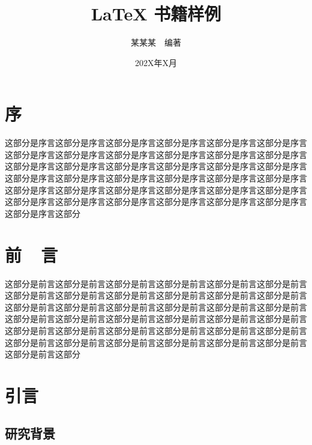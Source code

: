 \documentclass[UTF8,openany,twoside,12pt]{ctexbook}
\title{\bfseries LaTeX 书籍样例}
\author{\fangsong 某某某~~编著}
\date{\fangsong 202X年X月}
\theoremstyle{plain}
\renewcommand{\contentsname}{目~~录}%
\begin{document}
\maketitle

\thispagestyle{empty}

\frontmatter


\chapter{序}

这部分是序言这部分是序言这部分是序言这部分是序言这部分是序言这部分是序言这部分是序言这部分是序言这部分是序言这部分是序言这部分是序言这部分是序言这部分是序言这部分是序言这部分是序言这部分是序言这部分是序言这部分是序言这部分是序言这部分是序言这部分是序言这部分是序言这部分是序言这部分是序言这部分是序言这部分是序言这部分是序言这部分是序言这部分是序言这部分是序言这部分是序言这部分是序言这部分是序言这部分是序言这部分是序言这部分是序言这部分是序言这部分

\chapter{前~~言}

这部分是前言这部分是前言这部分是前言这部分是前言这部分是前言这部分是前言这部分是前言这部分是前言这部分是前言这部分是前言这部分是前言这部分是前言这部分是前言这部分是前言这部分是前言这部分是前言这部分是前言这部分是前言这部分是前言这部分是前言这部分是前言这部分是前言这部分是前言这部分是前言这部分是前言这部分是前言这部分是前言这部分是前言这部分是前言这部分是前言这部分是前言这部分是前言这部分是前言这部分是前言这部分是前言这部分是前言这部分是前言这部分


\renewcommand\contentsname{目~~录}
\cleardoublepage
{}
\pdfbookmark[chapter]{\contentsname}{toc}
\tableofcontents


\mainmatter   %



\chapter{引言}

\section{研究背景}
\end{document}
